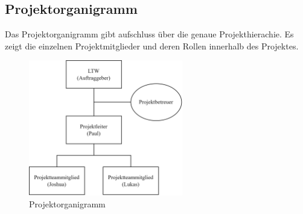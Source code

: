 \subsection{Projektorganigramm}

Das Projektorganigramm gibt aufschluss über die genaue Projekthierachie. Es zeigt die einzelnen Projektmitglieder und deren Rollen innerhalb des Projektes\cite{projektorganigramm}.

\begin{figure}[ht]
  \centering
  \includegraphics[width=0.6\textwidth]{images/projektorganigramm.png}
  \caption{Projektorganigramm}
  \label{fig:projektorganigramm}
\end{figure}